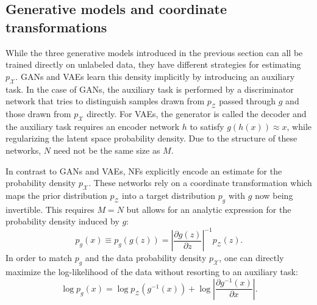 
\subsection{Generative models and coordinate transformations}
\label{sec:event_generation}

While the three generative models introduced in the previous section can all be trained directly on unlabeled data, they have different strategies for estimating $p_\mathcal{X}$.  GANs and VAEs learn this density implicitly by introducing an auxiliary task. In the case of GANs, the auxiliary task is performed by a discriminator network that tries to distinguish samples drawn from $p_\mathcal{Z}$ passed through $g$ and those drawn from $p_\mathcal{X}$ directly. For VAEs, the generator is called the decoder and the auxiliary task requires an encoder network $h$ to satisfy $g(h(x))\approx x$, while regularizing the latent space probability density.  Due to the structure of these networks, $N$ need not be the same size as $M$. 

In contrast to GANs and VAEs, NFs explicitly encode an estimate for the probability density $p_\mathcal{X}$. These networks rely on a coordinate transformation which maps the prior distribution $p_\mathcal{Z}$ into a target distribution $p_g$ with $g$ now being invertible. This requires $M=N$ but allows for an analytic expression for the probability density induced by $g$:
%
\begin{equation}
    p_{g}(x)\equiv p_g(g(z))=\left\vert\frac{\partial g(z)}{\partial z}\right\vert^{-1} p_\mathcal{Z}(z).
    \label{eq:coordinate_transform}
\end{equation}
%
In order to match $p_g$ and the data probability density $p_\mathcal{X}$, one can directly maximize the log-likelihood of the data without resorting to an auxiliary task:
\begin{equation}
    \log p_{g}(x)=\log p_\mathcal{Z}(g^{-1}(x)) + \log \left\vert\frac{\partial g^{-1}(x)}{\partial x}\right\vert.
\end{equation}

